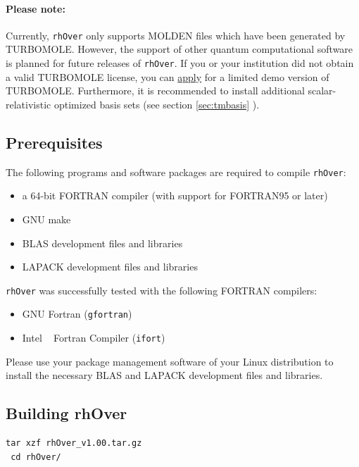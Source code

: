 \documentclass[11pt]{article}
\begin{document}
\noindent
\paragraph{Please note:} Currently, \texttt{rhOver} only supports MOLDEN files which have been generated by TURBOMOLE.\cite{TURBOMOLE}
However, the support of other quantum computational software is planned for future releases of \texttt{rhOver}.
If you or your institution did not obtain a valid TURBOMOLE license, you can \href{http://www.cosmologic.de/support-download/downloads/turbomoledemolicenseagreement.html}{apply} for a limited demo version of TURBOMOLE.
Furthermore, it is recommended to install additional scalar-relativistic optimized basis sets (see section \ref{sec:tmbasis} ).

\subsection{Prerequisites}

The following programs and software packages are required to compile \texttt{rhOver}:

\begin{itemize}
 \item a 64-bit FORTRAN compiler (with support for FORTRAN95 or later)
 \item GNU make
 \item BLAS development files and libraries
 \item LAPACK development files and libraries
\end{itemize}

\noindent
\texttt{rhOver} was successfully tested with the following FORTRAN compilers:

\begin{itemize}
 \item GNU Fortran (\texttt{gfortran})
 \item Intel \textregistered~ Fortran Compiler (\texttt{ifort})
\end{itemize}

\noindent
Please use your package management software of your Linux distribution to install the necessary BLAS and LAPACK development files and libraries.

\subsection{Building rhOver}\label{sec:building}

\begin{lstlisting}[frame=single,backgroundcolor=\color{bash}]
 tar xzf rhOver_v1.00.tar.gz
 cd rhOver/
\end{lstlisting}
\end{document}
